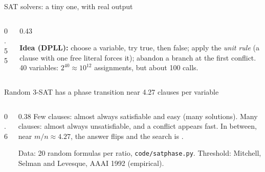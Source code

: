 \begin{frame}{SAT solvers: a tiny one, with real output}
\begin{columns}[T]
\begin{column}{0.55\textwidth}
\end{column}
\begin{column}{0.43\textwidth}
\vspace{1mm}\pyline
\vspace{1mm}

{\footnotesize \textbf{Idea (DPLL):} choose a variable, try true, then false; apply the \emph{unit rule} (a clause with one free literal forces it); abandon a branch at the first conflict. 40 variables: $2^{40}\approx10^{12}$ assignments, but about 100 calls.}
\end{column}
\end{columns}
\end{frame}

\begin{frame}{Random 3-SAT has a phase transition near 4.27 clauses per variable}
\begin{columns}[c]
\begin{column}{0.6\textwidth}
\end{column}
\begin{column}{0.38\textwidth}
\small Few clauses: almost always satisfiable and easy (many solutions). Many clauses: almost always unsatisfiable, and a conflict appears fast. In between, near $m/n\approx4.27$, the answer flips and the search is .

\vspace{2mm}
\footnotesize Data: 20 random formulas per ratio, \texttt{code/satphase.py}. Threshold: Mitchell, Selman and Levesque, AAAI 1992 (empirical).
\end{column}
\end{columns}
\end{frame}





